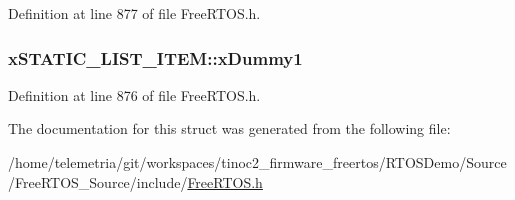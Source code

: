 Definition at line 877 of file Free\+R\+T\+O\+S.\+h.

\subsubsection[{\texorpdfstring{x\+Dummy1}{xDummy1}}]{ x\+S\+T\+A\+T\+I\+C\+\_\+\+L\+I\+S\+T\+\_\+\+I\+T\+E\+M\+::x\+Dummy1}\hypertarget{structx_s_t_a_t_i_c___l_i_s_t___i_t_e_m_abdb8e415f1bcfbba19fbf57d8d4e9438}{}\label{structx_s_t_a_t_i_c___l_i_s_t___i_t_e_m_abdb8e415f1bcfbba19fbf57d8d4e9438}


Definition at line 876 of file Free\+R\+T\+O\+S.\+h.



The documentation for this struct was generated from the following file\+:\begin{DoxyCompactItemize}
\item 
/home/telemetria/git/workspaces/tinoc2\+\_\+firmware\+\_\+freertos/\+R\+T\+O\+S\+Demo/\+Source/\+Free\+R\+T\+O\+S\+\_\+\+Source/include/\hyperlink{_free_r_t_o_s_8h}{Free\+R\+T\+O\+S.\+h}\end{DoxyCompactItemize}
